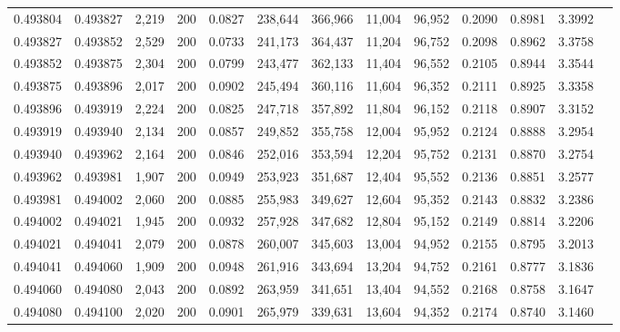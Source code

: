 \begin{tabular}{rrrrrrrrrrrrr}
0.493804 & 0.493827 &  2,219 & 200 &                                     0.0827 & 238,644 & 366,966 &  11,004 &  96,952 & 0.2090 & 0.8981 & 3.3992 \\
0.493827 & 0.493852 &  2,529 & 200 &                                     0.0733 & 241,173 & 364,437 &  11,204 &  96,752 & 0.2098 & 0.8962 & 3.3758 \\
0.493852 & 0.493875 &  2,304 & 200 &                                     0.0799 & 243,477 & 362,133 &  11,404 &  96,552 & 0.2105 & 0.8944 & 3.3544 \\
0.493875 & 0.493896 &  2,017 & 200 &                                     0.0902 & 245,494 & 360,116 &  11,604 &  96,352 & 0.2111 & 0.8925 & 3.3358 \\
0.493896 & 0.493919 &  2,224 & 200 &                                     0.0825 & 247,718 & 357,892 &  11,804 &  96,152 & 0.2118 & 0.8907 & 3.3152 \\
0.493919 & 0.493940 &  2,134 & 200 &                                     0.0857 & 249,852 & 355,758 &  12,004 &  95,952 & 0.2124 & 0.8888 & 3.2954 \\
0.493940 & 0.493962 &  2,164 & 200 &                                     0.0846 & 252,016 & 353,594 &  12,204 &  95,752 & 0.2131 & 0.8870 & 3.2754 \\
0.493962 & 0.493981 &  1,907 & 200 &                                     0.0949 & 253,923 & 351,687 &  12,404 &  95,552 & 0.2136 & 0.8851 & 3.2577 \\
0.493981 & 0.494002 &  2,060 & 200 &                                     0.0885 & 255,983 & 349,627 &  12,604 &  95,352 & 0.2143 & 0.8832 & 3.2386 \\
0.494002 & 0.494021 &  1,945 & 200 &                                     0.0932 & 257,928 & 347,682 &  12,804 &  95,152 & 0.2149 & 0.8814 & 3.2206 \\
0.494021 & 0.494041 &  2,079 & 200 &                                     0.0878 & 260,007 & 345,603 &  13,004 &  94,952 & 0.2155 & 0.8795 & 3.2013 \\
0.494041 & 0.494060 &  1,909 & 200 &                                     0.0948 & 261,916 & 343,694 &  13,204 &  94,752 & 0.2161 & 0.8777 & 3.1836 \\
0.494060 & 0.494080 &  2,043 & 200 &                                     0.0892 & 263,959 & 341,651 &  13,404 &  94,552 & 0.2168 & 0.8758 & 3.1647 \\
0.494080 & 0.494100 &  2,020 & 200 &                                     0.0901 & 265,979 & 339,631 &  13,604 &  94,352 & 0.2174 & 0.8740 & 3.1460 \\

\end{tabular}

